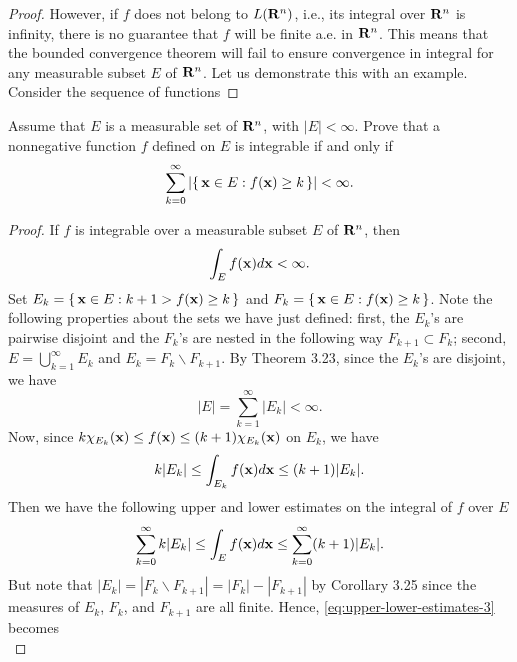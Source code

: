 \begin{proof}
However, if $f$ does not belong to $L(\mathbf{R}^n)$, i.e., its integral over
$\mathbf{R}^n$ is infinity, there is no guarantee that $f$ will be finite a.e.\@
in $\mathbf{R}^n$. This means that the bounded convergence theorem will fail to
ensure convergence in integral for any measurable subset $E$ of
$\mathbf{R}^n$. Let us demonstrate this with an example. Consider the sequence of
functions
\end{proof}

\begin{problem}
Assume that $E$ is a measurable set of $\mathbf{R}^n$, with
$|E|<\infty$. Prove that a nonnegative function $f$ defined
on $E$ is integrable if and only if
\[
\sum_{k=0}^\infty\left|\left\{\,\mathbf{x}\in E:f(\mathbf{x})\geq
    k\,\right\}\right|<\infty.
\]
\end{problem}
\begin{proof}
If $f$ is integrable over a measurable subset $E$ of $\mathbf{R}^n$, then
\begin{equation}
\label{eq:integrability-3}
\int_E f(\mathbf{x}) d \mathbf{x}<\infty.
\end{equation}
Set $E_k=\left\{\,\mathbf{x}\in E:k+1>f(\mathbf{x})\geq k\,\right\}$ and
$F_k=\left\{\,\mathbf{x}\in E:f(\mathbf{x})\geq k\,\right\}$. Note the
following properties about the sets we have just defined: first, the
$E_k$'s are pairwise disjoint and the $F_k$'s are nested in the following
way $F_{k+1}\subset F_k$; second, $E=\bigcup_{k=1}^\infty E_k$ and
$E_k=F_k\smallsetminus F_{k+1}$. By Theorem 3.23, since the $E_k$'s are disjoint,
we have
\begin{equation}
  \label{eq:disjoint-measurable-sets-3}
|E|=\sum_{k=1}^\infty|E_k|<\infty.
\end{equation}
Now, since $k\chi_{E_k}(\mathbf{x})\leq f(\mathbf{x})\leq (k+1)\chi_{E_k}(\mathbf{x})$ on
$E_k$, we have
\begin{equation}
\label{eq:estimates-E-k-3}
k|E_k|\leq\int_{E_k}f(\mathbf{x}) d \mathbf{x}\leq (k+1)|E_k|.
\end{equation}
Then we have the following upper and lower estimates on the integral of $f$
over $E$
\begin{equation}
\label{eq:upper-lower-estimates-3}
\sum_{k=0}^\infty k|E_k|\leq\int_E f(\mathbf{x}) d \mathbf{x}\leq\sum_{k=0}^\infty(k+1)|E_k|.
\end{equation}
But note that $|E_k|=|F_k\smallsetminus F_{k+1}|=|F_k|-|F_{k+1}|$ by Corollary 3.25
since the measures of $E_k$, $F_k$, and $F_{k+1}$ are all finite. Hence,
\eqref{eq:upper-lower-estimates-3} becomes
\begin{equation}
\label{eq:new-upper-lower-estimates-3}

\end{equation}
\end{proof}
